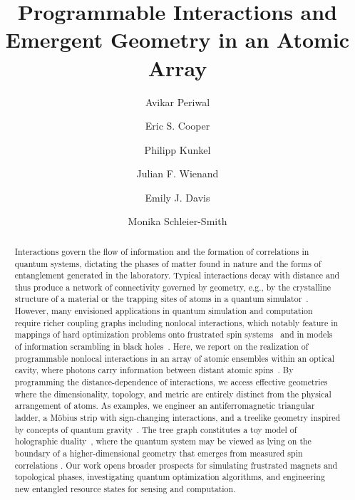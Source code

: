 \documentclass[aps,pra,twocolumn,superscriptaddress]{revtex4-1} %
\begin{document}
\begin{bibunit}
\renewcommand{\figurename}{\textbf{Fig.}}
\title{Programmable Interactions and Emergent Geometry in an Atomic Array}

\author{Avikar Periwal}
\author{Eric S. Cooper}
\author{Philipp Kunkel}
\author{Julian F. Wienand}
\author{Emily J. Davis}
\author{Monika Schleier-Smith}

\begin{abstract}
Interactions govern the flow of information and the formation of correlations in quantum systems, dictating the phases of matter found in nature and the forms of entanglement generated in the laboratory. Typical interactions decay with distance and thus produce a network of connectivity governed by geometry, e.g., by the crystalline structure of a material or the trapping sites of atoms in a quantum simulator~\cite{bloch2012quantum,browaeys2020many}.  However, many envisioned applications in quantum simulation and computation require richer coupling graphs including nonlocal interactions, which notably feature in mappings of hard optimization problems onto frustrated spin systems~\cite{Das2008,gopalakrishnan2011frustration,strack2011dicke,mcmahon2016fully,berloff2017realizing} and in models of information scrambling in black holes~\cite{hayden2007black,maldacena2016remarks,bentsen2019treelike,belyansky2020minimal}. Here, we report on the realization of programmable nonlocal interactions in an array of atomic ensembles within an optical cavity, where photons carry information between distant atomic spins~\cite{leroux2010implementation,barontini2015deterministic,hosten2016measurement,welte2018photon,pedrozo2020entanglement,davis2019photon,davis2020protecting,muniz2020exploring}.  By programming the distance-dependence of interactions, we access effective geometries where the dimensionality, topology, and metric are entirely distinct from the physical arrangement of atoms.  As examples, we engineer an antiferromagnetic triangular ladder, a M\"{o}bius strip with sign-changing interactions, and a treelike geometry inspired by concepts of quantum gravity~\cite{barbon2013fast,gubser2017p,heydeman2016tensor,bentsen2019treelike}. The tree graph constitutes a toy model of holographic duality~\cite{gubser2017p,heydeman2016tensor}, where the quantum system may be viewed as lying on the boundary of a higher-dimensional geometry that emerges from measured spin correlations \cite{qi2018does}.  Our work opens broader prospects for simulating frustrated magnets and topological phases, investigating quantum optimization algorithms, and engineering new entangled resource states for sensing and computation.



\end{abstract}
\end{bibunit}
\end{document}
